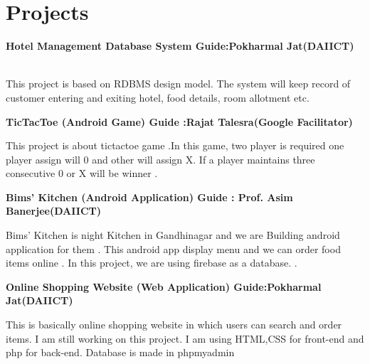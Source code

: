 \documentclass{article}
\begin{document}
\section{Projects}

\begin{large}
\textbf{Hotel Management Database System \hspace*{3cm} Guide:Pokharmal      Jat(DAIICT) }
\end{large} \\
This project is based on RDBMS design model. The system
will keep record of customer entering and exiting hotel, food details, room allotment etc.

\begin{large}\textbf{TicTacToe (Android Game) \hspace*{3cm} Guide  :Rajat Talesra(Google Facilitator)}
\end{large}
This project is about tictactoe game .In this game, two player is required one player assign will 0  and other will assign X. If a player maintains three consecutive 0 or X will be winner  .\hspace*{5.5cm}


\begin{large}\textbf{Bims' Kitchen (Android Application)\hspace{3cm} Guide : Prof. Asim Banerjee(DAIICT)}\end{large} 
Bims' Kitchen is night Kitchen in Gandhinagar and we are Building android application for them . This android app display menu and we can order food items online . In this project, we are using firebase as a database.
.\hspace{13cm}  

\begin{large}\textbf{Online Shopping Website (Web Application) \hspace*{3cm}Guide:Pokharmal      Jat(DAIICT)}
\end{large}
This is basically online shopping website in which users can search and order items. I am still working on this project.
I am using HTML,CSS for front-end and php for back-end. Database is made in phpmyadmin\hspace*{5.5cm}





\end{document}
